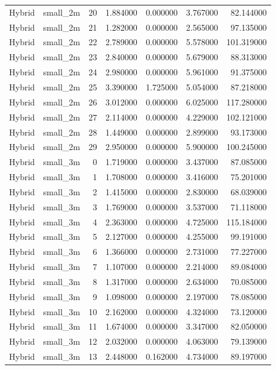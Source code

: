\begin{tabular}{llrrrrr}
Hybrid & small_2m & 20 & 1.884000 & 0.000000 & 3.767000 & 82.144000 \\
Hybrid & small_2m & 21 & 1.282000 & 0.000000 & 2.565000 & 97.135000 \\
Hybrid & small_2m & 22 & 2.789000 & 0.000000 & 5.578000 & 101.319000 \\
Hybrid & small_2m & 23 & 2.840000 & 0.000000 & 5.679000 & 88.313000 \\
Hybrid & small_2m & 24 & 2.980000 & 0.000000 & 5.961000 & 91.375000 \\
Hybrid & small_2m & 25 & 3.390000 & 1.725000 & 5.054000 & 87.218000 \\
Hybrid & small_2m & 26 & 3.012000 & 0.000000 & 6.025000 & 117.280000 \\
Hybrid & small_2m & 27 & 2.114000 & 0.000000 & 4.229000 & 102.121000 \\
Hybrid & small_2m & 28 & 1.449000 & 0.000000 & 2.899000 & 93.173000 \\
Hybrid & small_2m & 29 & 2.950000 & 0.000000 & 5.900000 & 100.245000 \\
Hybrid & small_3m & 0 & 1.719000 & 0.000000 & 3.437000 & 87.085000 \\
Hybrid & small_3m & 1 & 1.708000 & 0.000000 & 3.416000 & 75.201000 \\
Hybrid & small_3m & 2 & 1.415000 & 0.000000 & 2.830000 & 68.039000 \\
Hybrid & small_3m & 3 & 1.769000 & 0.000000 & 3.537000 & 71.118000 \\
Hybrid & small_3m & 4 & 2.363000 & 0.000000 & 4.725000 & 115.184000 \\
Hybrid & small_3m & 5 & 2.127000 & 0.000000 & 4.255000 & 99.191000 \\
Hybrid & small_3m & 6 & 1.366000 & 0.000000 & 2.731000 & 77.227000 \\
Hybrid & small_3m & 7 & 1.107000 & 0.000000 & 2.214000 & 89.084000 \\
Hybrid & small_3m & 8 & 1.317000 & 0.000000 & 2.634000 & 70.085000 \\
Hybrid & small_3m & 9 & 1.098000 & 0.000000 & 2.197000 & 78.085000 \\
Hybrid & small_3m & 10 & 2.162000 & 0.000000 & 4.324000 & 73.120000 \\
Hybrid & small_3m & 11 & 1.674000 & 0.000000 & 3.347000 & 82.050000 \\
Hybrid & small_3m & 12 & 2.032000 & 0.000000 & 4.063000 & 79.139000 \\
Hybrid & small_3m & 13 & 2.448000 & 0.162000 & 4.734000 & 89.197000 \\

\end{tabular}
